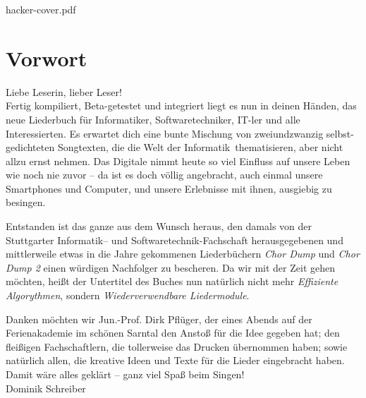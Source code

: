\documentclass[11pt,a5paper]{article}
\def\maketitle{
	\vspace*{0.5cm}
		\begin{overpic}[width=12.5cm]{hacker-cover.pdf}
		\end{overpic}
	}
\begin{document}
		
\maketitle
\thispagestyle{empty}
\pagebreak
\tableofcontents
\pagebreak

\small

\section*{Vorwort}

Liebe Leserin, lieber Leser! \\
			
Fertig kompiliert, Beta-getestet und integriert liegt es nun in deinen Händen, das neue Liederbuch für Informatiker, Softwaretechniker, IT-ler und alle Interessierten. 
Es erwartet dich eine bunte Mischung von zweiundzwanzig selbst-gedichteten Songtexten, die die \glqq Welt der Informatik\grqq \ thematisieren, aber nicht allzu ernst nehmen. Das Digitale nimmt heute so viel Einfluss auf unsere Leben wie noch nie zuvor -- da ist es doch völlig angebracht, auch einmal unsere Smartphones und Computer, und unsere Erlebnisse mit ihnen, ausgiebig zu besingen.

Entstanden ist das ganze aus dem Wunsch heraus, den damals von der Stuttgarter Informatik-- und Softwaretechnik-Fachschaft herausgegebenen und mittlerweile etwas in die Jahre gekommenen Liederbüchern \emph{Chor Dump} und \emph{Chor Dump 2} einen würdigen Nachfolger zu bescheren.
Da wir mit der Zeit gehen möchten, heißt der Untertitel des Buches nun natürlich nicht mehr \emph{Effiziente Algorythmen}, sondern \emph{Wiederverwendbare Liedermodule}.

Danken möchten wir Jun.-Prof. Dirk Pflüger, der eines Abends auf der Ferienakademie im schönen Sarntal den Anstoß für die Idee gegeben hat; den fleißigen Fachschaftlern, die tollerweise das Drucken übernommen haben; sowie natürlich allen, die kreative Ideen und Texte für die Lieder eingebracht haben. \\

Damit wäre alles geklärt -- ganz viel Spaß beim Singen! \\

\hfill Dominik Schreiber \\
\end{document}
